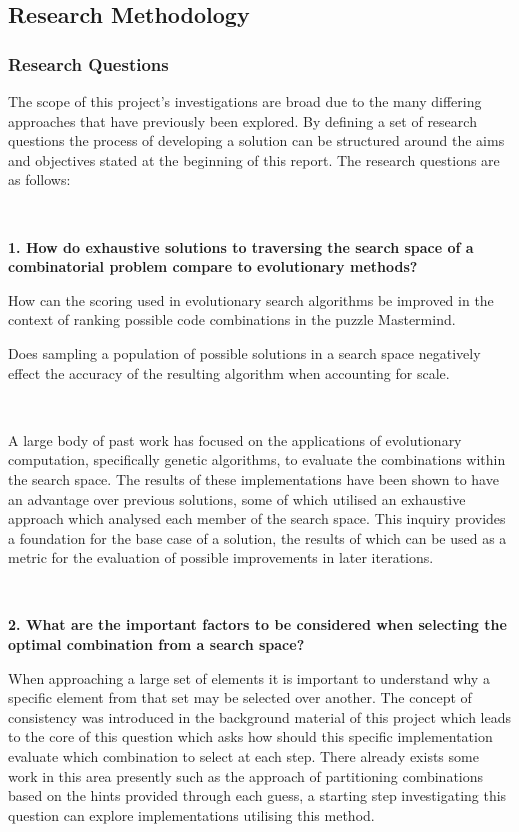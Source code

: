 \documentclass[11pt]{article}  %
\theoremstyle{definition}
\theoremstyle{remark}
\begin{document}
\subsection {Research Methodology}

\subsubsection {Research Questions}

The scope of this project's investigations are broad due to the many differing approaches that have previously been explored. By defining a set of research questions the process of developing a solution can be structured around the aims and objectives stated at the beginning of this report. The research questions are as follows:

\

\textbf{1. How do exhaustive solutions to traversing the search space of a combinatorial problem compare to evolutionary methods?}

How can the scoring used in evolutionary search algorithms be improved in the context of ranking possible code combinations in the puzzle Mastermind.

Does sampling a population of possible solutions in a search space negatively effect the accuracy of the resulting algorithm when accounting for scale.

\

A large body of past work has focused on the applications of evolutionary computation, specifically genetic algorithms, to evaluate the combinations within the search space. The results of these implementations have been shown to have an advantage over previous solutions, some of which utilised an exhaustive approach which analysed each member of the search space. This inquiry provides a foundation for the base case of a solution, the results of which can be used as a metric for the evaluation of possible improvements in later iterations.

\

\textbf{2. What are the important factors to be considered when selecting the optimal combination from a search space?}

When approaching a large set of elements it is important to understand why a specific element from that set may be selected over another. The concept of consistency was introduced in the background material of this project which leads to the core of this question which asks how should this specific implementation evaluate which combination to select at each step. There already exists some work in this area presently such as the approach of partitioning combinations based on the hints provided through each guess, a starting step investigating this question can explore implementations utilising this method.
\end{document}
